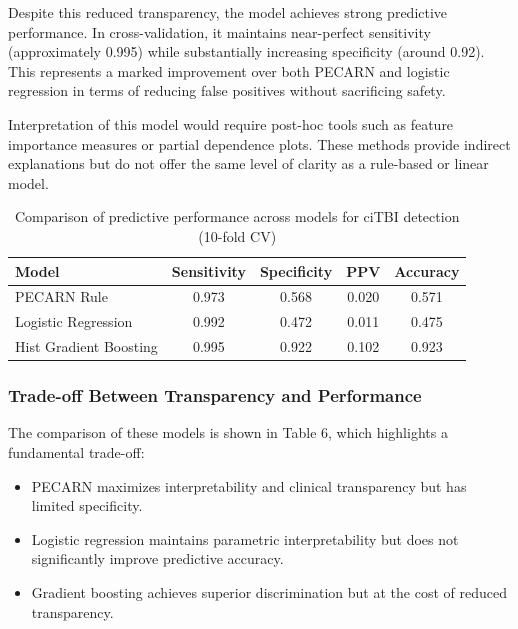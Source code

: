 \documentclass[11pt,letterpaper]{article}
\begin{document}
Despite this reduced transparency, the model achieves strong predictive performance. In cross-validation, it maintains near-perfect sensitivity (approximately 0.995) while substantially increasing specificity (around 0.92). This represents a marked improvement over both PECARN and logistic regression in terms of reducing false positives without sacrificing safety.

Interpretation of this model would require post-hoc tools such as feature importance measures or partial dependence plots. These methods provide indirect explanations but do not offer the same level of clarity as a rule-based or linear model.

\begin{table}[ht]
\centering
\small
\caption{Comparison of predictive performance across models for ciTBI detection (10-fold CV)}
\begin{tabular}{lcccc}
\toprule
\textbf{Model} 
& \textbf{Sensitivity} 
& \textbf{Specificity} 
& \textbf{PPV} 
& \textbf{Accuracy} \\
\midrule
PECARN Rule 
& 0.973 
& 0.568 
& 0.020 
& 0.571 \\

Logistic Regression 
& 0.992 
& 0.472 
& 0.011 
& 0.475 \\

Hist Gradient Boosting 
& 0.995 
& 0.922 
& 0.102 
& 0.923 \\
\bottomrule
\end{tabular}
\end{table}

\subsubsection{Trade-off Between Transparency and Performance}

The comparison of these models is shown in Table 6, which highlights a fundamental trade-off:

\begin{itemize}
    \item PECARN maximizes interpretability and clinical transparency but has limited specificity.
    \item Logistic regression maintains parametric interpretability but does not significantly improve predictive accuracy.
    \item Gradient boosting achieves superior discrimination but at the cost of reduced transparency.
\end{itemize}
\end{document}
